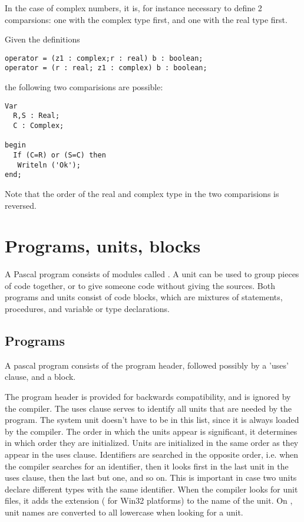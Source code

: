 \documentclass{report}
\begin{document}
In the case of complex numbers, it is, for instance necessary to define
2 comparsions: one with the complex type first, and one with the real type
first.

Given the definitions
\begin{verbatim}
operator = (z1 : complex;r : real) b : boolean;
operator = (r : real; z1 : complex) b : boolean;
\end{verbatim}
the following two comparisions are possible:
\begin{verbatim}
Var 
  R,S : Real;
  C : Complex;

begin
  If (C=R) or (S=C) then
   Writeln ('Ok');
end;
\end{verbatim}
Note that the order of the real and complex type in the two comparisions 
is reversed.


\chapter{Programs, units, blocks}
A Pascal program consists of modules called . A unit can be used
to group pieces of code together, or to give someone code without giving
the sources.
Both programs and units consist of code blocks, which are mixtures of
statements, procedures, and variable or type declarations.

\section{Programs}
A pascal program consists of the program header, followed possibly by a
'uses' clause, and a block.

The program header is provided for backwards compatibility, and is ignored
by the compiler.
The uses clause serves to identify all units that are needed by the program.
The system unit doesn't have to be in this list, since it is always loaded
by the compiler.
The order in which the units appear is significant, it determines in
which order they are initialized. Units are initialized in the same order
as they appear in the uses clause. Identifiers are searched in the opposite
order, i.e. when the compiler searches for an identifier, then it looks
first in the last unit in the uses clause, then the last but one, and so on.
This is important in case two units declare different types with the same
identifier.
When the compiler looks for unit files, it adds the extension 
( for Win32 platforms) to the name of the unit. On \linux, unit names
are converted to all lowercase when looking for a unit.
\end{document}
